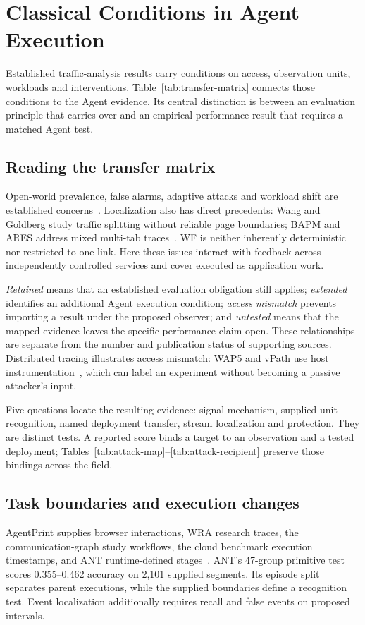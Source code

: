 \section{Classical Conditions in Agent Execution}\label{sec:correspondence}
Established traffic-analysis results carry conditions on access, observation units, workloads and interventions. Table~\ref{tab:transfer-matrix} connects those conditions to the Agent evidence. Its central distinction is between an evaluation principle that carries over and an empirical performance result that requires a matched Agent test.


\subsection{Reading the transfer matrix}
Open-world prevalence, false alarms, adaptive attacks and workload shift are established concerns~\cite{juarez2014critical,hayes2016kfp,dyer2012peekaboo,mathews2023critical,arp2022dos,tramer2020adaptive}. Localization also has direct precedents: Wang and Goldberg study traffic splitting without reliable page boundaries; BAPM and ARES address mixed multi-tab traces~\cite{wang2016realistic,guan2021bapm,deng2023ares}. WF is neither inherently deterministic nor restricted to one link. Here these issues interact with feedback across independently controlled services and cover executed as application work.

\emph{Retained} means that an established evaluation obligation still applies; \emph{extended} identifies an additional Agent execution condition; \emph{access mismatch} prevents importing a result under the proposed observer; and \emph{untested} means that the mapped evidence leaves the specific performance claim open. These relationships are separate from the number and publication status of supporting sources. Distributed tracing illustrates access mismatch: WAP5 and vPath use host instrumentation~\cite{reynolds2006wap5,tak2009vpath}, which can label an experiment without becoming a passive attacker's input.

Five questions locate the resulting evidence: signal mechanism, supplied-unit recognition, named deployment transfer, stream localization and protection. They are distinct tests. A reported score binds a target to an observation and a tested deployment; Tables~\ref{tab:attack-map}--\ref{tab:attack-recipient} preserve those bindings across the field.


\subsection{Task boundaries and execution changes}
AgentPrint supplies browser interactions, WRA research traces, the communication-graph study workflows, the cloud benchmark execution timestamps, and ANT runtime-defined stages~\cite{agentprint2025,jeong2026wra,dangol2026workflow,pouryousef2026traffic,li2026ant}. ANT's 47-group primitive test scores 0.355--0.462 accuracy on 2,101 supplied segments. Its episode split separates parent executions, while the supplied boundaries define a recognition test. Event localization additionally requires recall and false events on proposed intervals.

